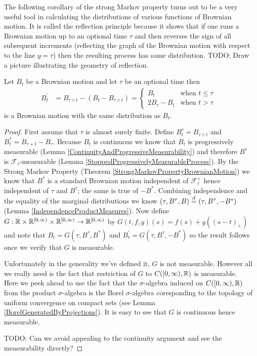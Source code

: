 The following corollary of the strong Markov property turns out to be
a very useful tool in calculating the distributions of various
functions of Brownian motion.  It is called the reflection principle
because it shows that if one runs a Brownian motion up to an optional
time $\tau$ and then reverses the sign of all subsequent increments
(reflecting the graph of the Brownian motion with respect to the line
$y=\tau$) then the resulting process has same distribution.  TODO: Draw a picture illustrating the
geometry of reflection.
\begin{lem}\label{ReflectionPrinciple}Let $B_t$ be a Brownian motion and let $\tau$ be an
  optional time then 
\begin{align*}
B^\prime_t &= B_{\tau \wedge t} - (B_t - B_{\tau \wedge t}) = \begin{cases}
B_t & \text{when $t \leq \tau$} \\
2 B_\tau - B_t & \text{when $t > \tau$}
\end{cases}
\end{align*}
is a Brownian motion with the same distribution as $B_t$.
\end{lem}
\begin{proof}
First assume that $\tau$ is almost surely finite.  Define $B^\tau_t =
B_{\tau \wedge t}$ and $B^*_t = B_{\tau + t} - B_{\tau}$.  Because
$B_t$ is continuous we know that $B_t$ is progressively measurable
(Lemma \ref{ContinuityAndProgressiveMeasurability}) and therefore $B^\tau$ is
$\mathcal{F}_\tau$-measurable (Lemma \ref{StoppedProgressivelyMeasurableProcess}).  By the Strong Markov Property (Theorem
\ref{StrongMarkovPropertyBrownianMotion}) we know that $B^*$ is a standard Brownian
motion independent of $\mathcal{F}^+_\tau$ hence independent of $\tau$
and $B^\tau$; the same is true of $-B^*$.  Combining independence and
the equality of the marginal distributions we know $(\tau, B^\tau,
B) \overset{d}= (\tau, B^\tau, -B^*)$ (Lemma
\ref{IndependenceProductMeasures}).  Now define $G : \mathbb{R} \times
\mathbb{R}^{[0,\infty)} \times \mathbb{R}^{[0,\infty)} \to
\mathbb{R}^{[0,\infty)}$ by $G(t,f,g)(s) = f(s) + g((s-t)_+)$ and note
that $B_t = G(\tau, B^\tau, B^*)$ and $B^\prime_t = G(\tau, B^\tau,
-B^*)$ so the result follows once we verify that $G$ is measurable.

Unfortunately in the generality we've defined it, $G$ is not
measurable.  However all we really need is the fact that restriction
of $G$ to $C([0,\infty), \mathbb{R})$ is measurable.  Here we peek ahead
to use the fact that the $\sigma$-algebra induced on $C([0,\infty),
\mathbb{R})$ from the product $\sigma$-algebra is the Borel
$\sigma$-algebra coresponding to the topology of uniform convergence
on compact sets (see Lemma \ref{BorelGeneratedByProjections}).  It is
easy to see that $G$ is continuous hence measurable.

TODO: Can we avoid appealing to the continuity argument and see the
measurability directly?
\end{proof}

